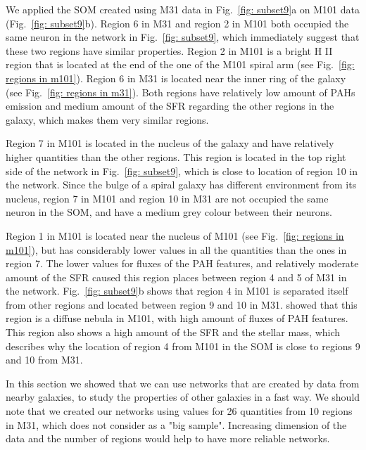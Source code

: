     We applied the SOM created using M31 data in Fig.~\ref{fig: subset9}a on M101 data (Fig.~\ref{fig: subset9}b).
    Region 6 in M31 and region 2 in M101 both occupied the same neuron in the network in Fig.~\ref{fig: subset9}, which immediately suggest that these two regions have similar properties. 
    Region 2 in M101 is a bright H {\sc II} region that is located at the end of the one of the M101 spiral arm (see Fig.~\ref{fig: regions in m101}). 
    Region 6 in M31 is located near the inner ring of the galaxy (see Fig.~\ref{fig: regions in m31}).
    Both regions have relatively low amount of PAHs emission and medium amount of the SFR regarding the other regions in the galaxy, which makes them very similar regions.
    
    Region 7 in M101 is located in the nucleus of the galaxy and have relatively higher quantities than the other regions.
    This region is located in the top right side of the network in Fig.~\ref{fig: subset9}, which is close to location of region 10 in the network.
    Since the bulge of a spiral galaxy has different environment from its nucleus, region 7 in M101 and region 10 in M31 are not occupied the same neuron in the SOM, and have a medium grey colour between their neurons.

    Region 1 in M101 is located near the nucleus of M101 (see Fig.~\ref{fig: regions in m101}), but has considerably lower values in all the quantities than the ones in region 7.
    The lower values for fluxes of the PAH features, and relatively moderate amount of the SFR caused this region places between region 4 and 5 of M31 in the network. 
    Fig.~\ref{fig: subset9}b shows that region 4 in M101 is separated itself from other regions and located between region 9 and 10 in M31.
    \cite{Gordon08} showed that this region is a diffuse nebula in M101, with high amount of fluxes of PAH features. 
    This region also shows a high amount of the SFR and the stellar mass, which describes why the location of region 4 from M101 in the SOM is close to regions 9 and 10 from M31.
    
    In this section we showed that we can use networks that are created by data from nearby galaxies, to study the properties of other galaxies in a fast way.
    We should note that we created our networks using values for 26 quantities from 10 regions in M31, which does not consider as a "big sample".
    Increasing dimension of the data and the number of regions would help to have more reliable networks.
    
    

